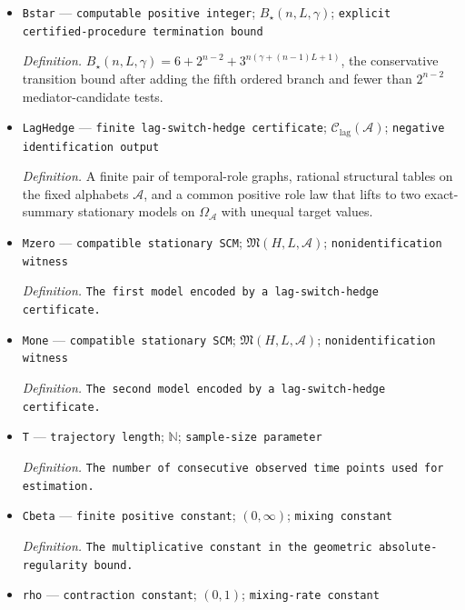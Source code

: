 \documentclass{article}
\begin{document}
\begin{itemize}
  \par\smallskip\noindent\emph{Definition.} The five-state offset-sensitive trace constructed in \(\mathrm{def:frontdoor\text{-}outside\text{-}trace}\).
  \item \texttt{Bstar} --- \texttt{computable positive integer}; \(B_\star(n,L,\gamma)\); \texttt{explicit certified-\allowbreak{}procedure termination bound}
  \par\smallskip\noindent\emph{Definition.} \(B_\star(n,L,\gamma)=6+2^{n-2}+3^{n(\gamma+(n-1)L+1)}\), the conservative transition bound after adding the fifth ordered branch and fewer than \(2^{n-2}\) mediator-candidate tests.
  \item \texttt{LagHedge} --- \texttt{finite lag-\allowbreak{}switch-\allowbreak{}hedge certificate}; \(\mathcal C_{\mathrm{lag}}(\mathcal A)\); \texttt{negative identification output}
  \par\smallskip\noindent\emph{Definition.} A finite pair of temporal-role graphs, rational structural tables on the fixed alphabets \(\mathcal A\), and a common positive role law that lifts to two exact-summary stationary models on \(\Omega_{\mathcal A}\) with unequal target values.
  \item \texttt{Mzero} --- \texttt{compatible stationary SCM}; \(\mathfrak M(H,L,\mathcal A)\); \texttt{nonidentification witness}
  \par\smallskip\noindent\emph{Definition.} \texttt{The first model encoded by a lag-\allowbreak{}switch-\allowbreak{}hedge certificate.}
  \item \texttt{Mone} --- \texttt{compatible stationary SCM}; \(\mathfrak M(H,L,\mathcal A)\); \texttt{nonidentification witness}
  \par\smallskip\noindent\emph{Definition.} \texttt{The second model encoded by a lag-\allowbreak{}switch-\allowbreak{}hedge certificate.}
  \item \texttt{T} --- \texttt{trajectory length}; \(\mathbb N\); \texttt{sample-\allowbreak{}size parameter}
  \par\smallskip\noindent\emph{Definition.} \texttt{The number of consecutive observed time points used for estimation.}
  \item \texttt{Cbeta} --- \texttt{finite positive constant}; \((0,\infty)\); \texttt{mixing constant}
  \par\smallskip\noindent\emph{Definition.} \texttt{The multiplicative constant in the geometric absolute-\allowbreak{}regularity bound.}
  \item \texttt{rho} --- \texttt{contraction constant}; \((0,1)\); \texttt{mixing-\allowbreak{}rate constant}

\end{itemize}
\end{document}
